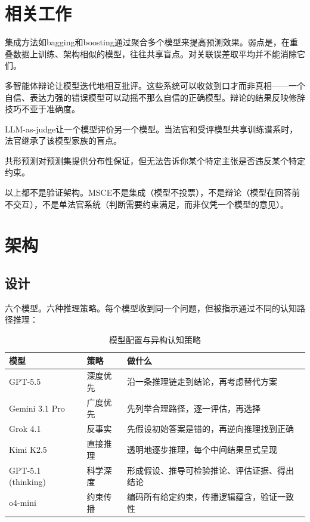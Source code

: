 \documentclass[11pt,a4paper]{ctexart}
\begin{document}
\section{相关工作}

集成方法如bagging和boosting通过聚合多个模型来提高预测效果。弱点是，在重叠数据上训练、架构相似的模型，往往共享盲点。对关联误差取平均并不能消除它们。

多智能体辩论让模型迭代地相互批评。这些系统可以收敛到口才而非真相——一个自信、表达力强的错误模型可以动摇不那么自信的正确模型。辩论的结果反映修辞技巧不亚于准确度。

LLM-as-judge让一个模型评价另一个模型。当法官和受评模型共享训练谱系时，法官继承了该模型家族的盲点。

共形预测对预测集提供分布性保证，但无法告诉你某个特定主张是否违反某个特定约束。

以上都不是验证架构。MSCE不是集成（模型不投票），不是辩论（模型在回答前不交互），不是单法官系统（判断需要约束满足，而非仅凭一个模型的意见）。

\section{架构}

\subsection{设计}

六个模型。六种推理策略。每个模型收到同一个问题，但被指示通过不同的认知路径推理：

\begin{table}[ht]
\centering
\caption{模型配置与异构认知策略}
\label{tab:models}
\begin{tabular}{>{\sffamily}ll>{\raggedright\arraybackslash}p{5.5cm}}
\toprule
\textbf{模型} & \textbf{策略} & \textbf{做什么} \\
\midrule
GPT-5.5 & 深度优先 & 沿一条推理链走到结论，再考虑替代方案 \\
Gemini 3.1 Pro & 广度优先 & 先列举合理路径，逐一评估，再选择 \\
Grok 4.1 & 反事实 & 先假设初始答案是错的，再逆向推理找到正确 \\
Kimi K2.5 & 直接推理 & 透明地逐步推理，每个中间结果显式呈现 \\
GPT-5.1 (thinking) & 科学深度 & 形成假设、推导可检验推论、评估证据、得出结论 \\
o4-mini & 约束传播 & 编码所有给定约束，传播逻辑蕴含，验证一致性 \\
\bottomrule
\end{tabular}
\end{table}
\end{document}
